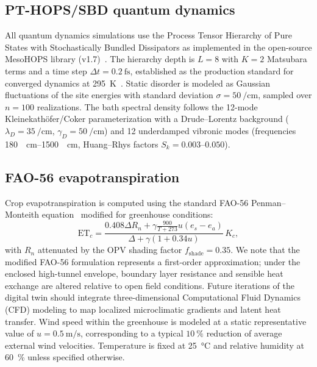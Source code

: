 \documentclass[onecolumn,a4paper,12pt]{article}
\begin{document}
\subsection*{PT-HOPS/SBD quantum dynamics}

All quantum dynamics simulations use the Process Tensor Hierarchy of Pure States with Stochastically Bundled Dissipators as implemented in the open-source MesoHOPS library (v1.7)~\cite{Varvelo2021}.
The hierarchy depth is $L = 8$ with $K = 2$ Matsubara terms and a time step $\Delta t = \qty{0.2}{\fs}$, established as the production standard for converged dynamics at \qty{295}{\kelvin}~\cite{Kouam2026}.
Static disorder is modeled as Gaussian fluctuations of the site energies with standard deviation $\sigma = \qty{50}{\per\cm}$, sampled over $n = 100$ realizations.
The bath spectral density follows the 12-mode Kleinekath\"{o}fer/Coker parameterization with a Drude--Lorentz background ($\lambda_D = \qty{35}{\per\cm}$, $\gamma_D = \qty{50}{\per\cm}$) and 12 underdamped vibronic modes (frequencies \qtyrange{180}{1500}{\per\cm}, Huang--Rhys factors $S_k = \numrange{0.003}{0.050}$).

\subsection*{FAO-56 evapotranspiration}

Crop evapotranspiration is computed using the standard FAO-56 Penman--Monteith equation~\cite{Allen1998} modified for greenhouse conditions:
\begin{equation}
\mathrm{ET}_c = \frac{0.408 \Delta R_n + \gamma \frac{900}{T+273} u (e_s - e_a)}{\Delta + \gamma(1 + 0.34 u)} \, K_c,
\end{equation}
with $R_n$ attenuated by the OPV shading factor $f_{\mathrm{shade}} = 0.35$.
We note that the modified FAO-56 formulation represents a first-order approximation; under the enclosed high-tunnel envelope, boundary layer resistance and sensible heat exchange are altered relative to open field conditions. Future iterations of the digital twin should integrate three-dimensional Computational Fluid Dynamics (CFD) modeling to map localized microclimatic gradients and latent heat transfer. Wind speed within the greenhouse is modeled at a static representative value of $u = \qty{0.5}{\m\per\s}$, corresponding to a typical $\qty{10}{\percent}$ reduction of average external wind velocities.
Temperature is fixed at \qty{25}{\celsius} and relative humidity at \qty{60}{\percent} unless specified otherwise.
\end{document}
